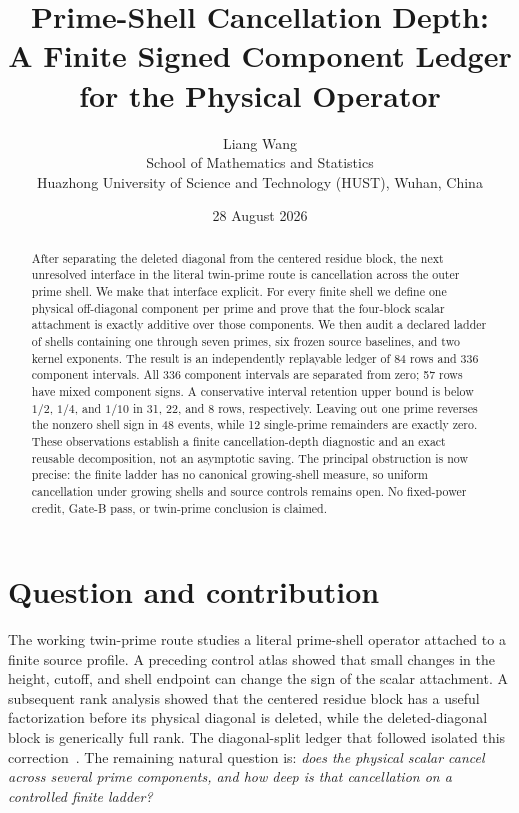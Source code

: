 \documentclass[11pt]{article}
\title{Prime-Shell Cancellation Depth:\\
  A Finite Signed Component Ledger for the Physical Operator}
\author{Liang Wang\\
School of Mathematics and Statistics\\
Huazhong University of Science and Technology (HUST), Wuhan, China}
\date{28 August 2026}
\newcommand{\1}{\mathbf{1}}
\begin{document}
\maketitle

\begin{abstract}
After separating the deleted diagonal from the centered residue block, the
next unresolved interface in the literal twin-prime route is cancellation
across the outer prime shell.  We make that interface explicit.  For every
finite shell we define one physical off-diagonal component per prime and prove
that the four-block scalar attachment is exactly additive over those
components.  We then audit a declared ladder of shells containing one through
seven primes, six frozen source baselines, and two kernel exponents.  The
result is an independently replayable ledger of 84 rows and 336 component
intervals.  All 336 component intervals are separated from zero; 57 rows have
mixed component signs.  A conservative interval retention upper bound is
below $1/2$, $1/4$, and $1/10$ in 31, 22, and 8 rows, respectively.  Leaving
out one prime reverses the nonzero shell sign in 48 events, while 12
single-prime remainders are exactly zero.  These observations establish a
finite cancellation-depth diagnostic and an exact reusable decomposition, not
an asymptotic saving.  The principal obstruction is now precise: the finite
ladder has no canonical growing-shell measure, so uniform cancellation under
growing shells and source controls remains open.  No fixed-power credit, Gate-B
pass, or twin-prime conclusion is claimed.
\end{abstract}

\section{Question and contribution}

The working twin-prime route studies a literal prime-shell operator attached to
a finite source profile.  A preceding control atlas showed that small changes
in the height, cutoff, and shell endpoint can change the sign of the scalar
attachment.  A subsequent rank analysis showed that the centered residue block
has a useful factorization before its physical diagonal is deleted, while the
deleted-diagonal block is generically full rank.  The diagonal-split ledger
that followed isolated this correction~\cite{tpc284,tpc285,tpc286}.  The
remaining natural question is:
\emph{does the physical scalar cancel across several prime components, and how
deep is that cancellation on a controlled finite ladder?}
\end{document}
